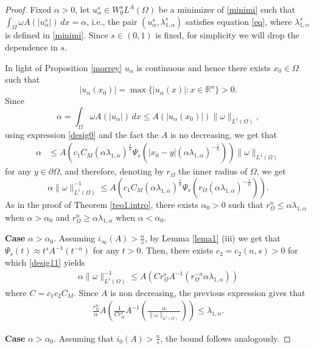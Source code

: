 \documentclass[12pt,reqno]{amsart}
\theoremstyle{definition}
\theoremstyle{remark}
\numberwithin{equation}{section}
\begin{document}
\begin{proof}
Fixed $\alpha>0$, let $u_\alpha^s \in W^s_0 L^A(\Omega)$ be a minimizer of \eqref{minimi} such that $\int_\Omega \omega A(|u_\alpha^s|)\,dx =\alpha$, i.e., the pair $(u_\alpha^s, \lambda_{1,\alpha}^s)$ satisfies equation \eqref{eq}, where  $\lambda_{1,\alpha}^s$ is defined in \eqref{minimi}. Since $s\in(0,1)$ is fixed, for simplicity we will drop the dependence in $s$.

\noindent In light of Proposition \ref{morrey}  $u_\alpha$ is  continuous and hence there exists $x_0\in \Omega$ such that
$$
|u_\alpha(x_0)|=\max\{|u_\alpha(x)|\colon x \in \mathbb{R}^n\}>0.
$$
Since
$$
\alpha = \int_\Omega \omega A(|u_\alpha|)\,dx \leq A(|u_\alpha(x_0)|) \|\omega\|_{L^1(\Omega)},
$$
using expression \eqref{desig0} and the fact the $A$ is no decreasing,  we get that
\begin{align*}
\alpha &\leq
A\left( c_1  C_M \left(\alpha \lambda_{1,\alpha}  \right)^{\frac{s}{n}}\Psi_s \left( |x_0-y| \left( \alpha \lambda_{1,\alpha}   \right)^{-\frac{1}{n}}\right) \right) \|\omega\|_{L^1(\Omega)}
\end{align*}
for any $y\in \partial\Omega$, and therefore,  denoting by $r_\Omega$ the inner radius of $\Omega$, we get
\begin{equation} \label{desig11}
\alpha \|\omega\|_{L^1(\Omega)}^{-1}  
\leq
A\left( c_1  C_M \left(\alpha \lambda_{1,\alpha} \right)^{\frac{s}{n}}\Psi_s \left( r_\Omega \left( \alpha \lambda_{1,\alpha}   \right)^{-\frac{1}{n}}\right) \right).
\end{equation}
As in the proof of Theorem \ref{teo1.intro},  there exists $\alpha_0>0$ such that  $r_\Omega^n  \leq \alpha \lambda_{1,\alpha}$ when $\alpha>\alpha_0$ and $r_\Omega^n \geq \alpha \lambda_{1,\alpha}$ when $\alpha<\alpha_0$.

\medskip

{\bf Case }$\alpha>\alpha_0$. Assuming  $i_\infty(A) >\frac{n}{s}$, by  Lemma \ref{lema1} (iii) we get that $\Psi_s(t) \approx t^s A^{-1} (t^{-n})$ for any $t>0$. Then, there exists $c_2=c_2(n,s)>0$ for which  \eqref{desig11} yields
\begin{align*}
\alpha \|\omega\|_{L^1(\Omega)}^{-1}\leq 
A\left( C r_\Omega^s A^{-1} \left(   r_\Omega^{-n}\alpha \lambda_{1,\alpha} \right) \right)
\end{align*}
where $C=c_1c_2C_M$. Since $A$ is non decreasing, the previous expression gives that 
\begin{align*}
\frac{r_\Omega^n}{\alpha} A\left( \frac{1}{C r_\Omega ^s}A^{-1}\left( \frac{\alpha}{ \|\omega\|_{L^1(\Omega)}} \right) \right)
\leq 
    \lambda_{1,\alpha}.
\end{align*} 

{\bf Case }$\alpha>\alpha_0$. Assuming that $i_0(A) >\frac{n}{s}$, the bound follows analogously.
\end{proof}
\end{document}
